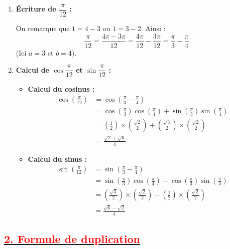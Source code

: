 \documentclass[12pt,a4paper]{article}
\newcounter{remarque}
\begin{document}
\begin{enumerate}
    \item \textbf{Écriture de $\dfrac{\pi}{12}$ :}
    
    On remarque que $1 = 4 - 3$ ou $1 = 3 - 2$. Ainsi :
    \[
    \frac{\pi}{12} = \frac{4\pi - 3\pi}{12} = \frac{4\pi}{12} - \frac{3\pi}{12} = \frac{\pi}{3} - \frac{\pi}{4}
    \]
    (Ici $a = 3$ et $b = 4$).

    \vspace{0.3cm}

    \item \textbf{Calcul de $\cos \dfrac{\pi}{12}$ et $\sin \dfrac{\pi}{12}$ :}
    
    \begin{itemize}
        \item \textbf{Calcul du cosinus :}
        \begin{align*}
        \cos\left(\frac{\pi}{12}\right) &= \cos\left(\frac{\pi}{3} - \frac{\pi}{4}\right) \\
        &= \cos\left(\frac{\pi}{3}\right)\cos\left(\frac{\pi}{4}\right) + \sin\left(\frac{\pi}{3}\right)\sin\left(\frac{\pi}{4}\right) \\
        &= \left(\frac{1}{2}\right) \times \left(\frac{\sqrt{2}}{2}\right) + \left(\frac{\sqrt{3}}{2}\right) \times \left(\frac{\sqrt{2}}{2}\right) \\
        &= \frac{\sqrt{2} + \sqrt{6}}{4}
        \end{align*}

        \item \textbf{Calcul du sinus :}
        \begin{align*}
        \sin\left(\frac{\pi}{12}\right) &= \sin\left(\frac{\pi}{3} - \frac{\pi}{4}\right) \\
        &= \sin\left(\frac{\pi}{3}\right)\cos\left(\frac{\pi}{4}\right) - \cos\left(\frac{\pi}{3}\right)\sin\left(\frac{\pi}{4}\right) \\
        &= \left(\frac{\sqrt{3}}{2}\right) \times \left(\frac{\sqrt{2}}{2}\right) - \left(\frac{1}{2}\right) \times \left(\frac{\sqrt{2}}{2}\right) \\
        &= \frac{\sqrt{6} - \sqrt{2}}{4}
        \end{align*}
    \end{itemize}
\end{enumerate}

\subsection*{\underline{\textbf{\textcolor{red}{2. Formule de duplication }}}}
\end{document}
